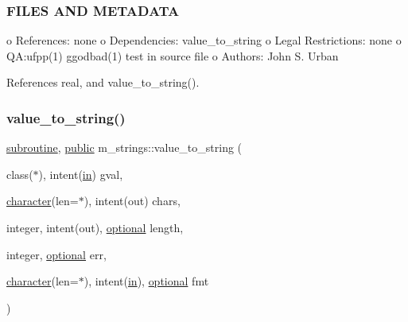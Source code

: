 \subsubsection*{F\+I\+L\+ES A\+ND M\+E\+T\+A\+D\+A\+TA}

\begin{DoxyVerb}   o  References: none
   o  Dependencies: value_to_string
   o  Legal Restrictions: none
   o  QA:ufpp(1) ggodbad(1) test in source file
   o  Authors: John S. Urban \end{DoxyVerb}
 

References real, and value\+\_\+to\+\_\+string().

\mbox{\label{namespacem__strings_a58d30b135c367184a666f8b4baaa64b5}} 
\subsubsection{\texorpdfstring{value\+\_\+to\+\_\+string()}{value\_to\_string()}}
{\footnotesize\ttfamily \hyperlink{M__stopwatch_83_8txt_acfbcff50169d691ff02d4a123ed70482}{subroutine}, \hyperlink{M__stopwatch_83_8txt_a2f74811300c361e53b430611a7d1769f}{public} m\+\_\+strings\+::value\+\_\+to\+\_\+string (\begin{DoxyParamCaption}\item[{class($\ast$), intent(\hyperlink{M__journal_83_8txt_afce72651d1eed785a2132bee863b2f38}{in})}]{gval,  }\item[{\hyperlink{option__stopwatch_83_8txt_abd4b21fbbd175834027b5224bfe97e66}{character}(len=$\ast$), intent(out)}]{chars,  }\item[{integer, intent(out), \hyperlink{option__stopwatch_83_8txt_aa4ece75e7acf58a4843f70fe18c3ade5}{optional}}]{length,  }\item[{integer, \hyperlink{option__stopwatch_83_8txt_aa4ece75e7acf58a4843f70fe18c3ade5}{optional}}]{err,  }\item[{\hyperlink{option__stopwatch_83_8txt_abd4b21fbbd175834027b5224bfe97e66}{character}(len=$\ast$), intent(\hyperlink{M__journal_83_8txt_afce72651d1eed785a2132bee863b2f38}{in}), \hyperlink{option__stopwatch_83_8txt_aa4ece75e7acf58a4843f70fe18c3ade5}{optional}}]{fmt }\end{DoxyParamCaption})}



